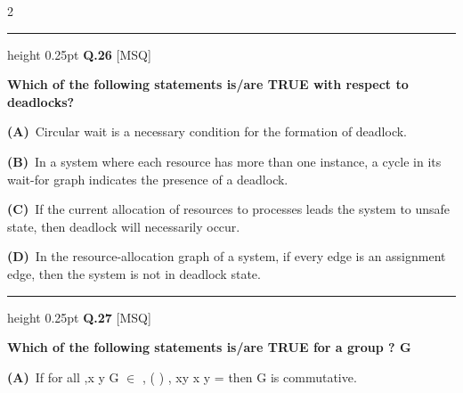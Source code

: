 \documentclass[a4paper,10pt,twoside]{article}
\begin{document}
\begin{multicols}{2}
\par\vspace{6pt}\hrule height 0.25pt\vspace{6pt}
\noindent\textbf{Q.26} \hfill {\footnotesize\textsf{[MSQ]}}
\par\vspace{2pt}
{\bfseries Which of the following statements is/are TRUE with respect to deadlocks? \par}
\par\vspace{2pt}\noindent
\textbf{(A)}~Circular wait is a necessary condition for the formation of deadlock.\par\vspace{2pt}\noindent
\textbf{(B)}~In a system where each resource has more than one instance, a cycle in its wait-for \newline graph indicates the presence of a deadlock.\par\vspace{2pt}\noindent
\textbf{(C)}~If the current allocation of resources to processes leads the system to unsafe state, \newline then deadlock will necessarily occur.\par\vspace{2pt}\noindent
\textbf{(D)}~In the resource-allocation graph of a system, if every edge is an assignment edge, \newline then the system is not in deadlock state.
\par\vspace{6pt}\hrule height 0.25pt\vspace{6pt}
\noindent\textbf{Q.27} \hfill {\footnotesize\textsf{[MSQ]}}
\par\vspace{2pt}
{\bfseries Which of the following statements is/are TRUE for a group
?
G \par}
\par\vspace{2pt}\noindent
\textbf{(A)}~If for all ,x y \newline G \newline $\in$ \newline ,    \newline ( \newline ) \newline , \newline xy \newline x y \newline = \newline then G is commutative.\par\vspace{2pt}\noindent

\end{multicols}
\end{document}
